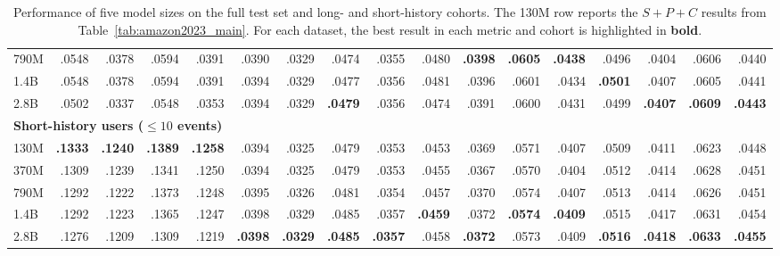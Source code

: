 ﻿\documentclass[sigconf,anonymous,review]{acmart}
\begin{document}
\begin{table}[!tbp]
{\begin{tabular}{l*{4}{rrrr}}
790M & .0548 & .0378 & .0594 & .0391 & .0390 & .0329 & .0474 & .0355 & .0480 & \textbf{.0398} & \textbf{.0605} & \textbf{.0438} & .0496 & .0404 & .0606 & .0440 \\
1.4B & .0548 & .0378 & .0594 & .0391 & .0394 & .0329 & .0477 & .0356 & .0481 & .0396 & .0601 & .0434 & \textbf{.0501} & .0407 & .0605 & .0441 \\
2.8B & .0502 & .0337 & .0548 & .0353 & .0394 & .0329 & \textbf{.0479} & .0356 & .0474 & .0391 & .0600 & .0431 & .0499 & \textbf{.0407} & \textbf{.0609} & \textbf{.0443} \\
        \midrule
        \multicolumn{17}{l}{\textbf{Short-history users ($\leq10$ events)}} \\
130M & \textbf{.1333} & \textbf{.1240} & \textbf{.1389} & \textbf{.1258} & .0394 & .0325 & .0479 & .0353 & .0453 & .0369 & .0571 & .0407 & .0509 & .0411 & .0623 & .0448 \\
370M & .1309 & .1239 & .1341 & .1250 & .0394 & .0325 & .0479 & .0353 & .0455 & .0367 & .0570 & .0404 & .0512 & .0414 & .0628 & .0451 \\
790M & .1292 & .1222 & .1373 & .1248 & .0395 & .0326 & .0481 & .0354 & .0457 & .0370 & .0574 & .0407 & .0513 & .0414 & .0626 & .0451 \\
1.4B & .1292 & .1223 & .1365 & .1247 & .0398 & .0329 & .0485 & .0357 & \textbf{.0459} & .0372 & \textbf{.0574} & \textbf{.0409} & .0515 & .0417 & .0631 & .0454 \\
2.8B & .1276 & .1209 & .1309 & .1219 & \textbf{.0398} & \textbf{.0329} & \textbf{.0485} & \textbf{.0357} & .0458 & \textbf{.0372} & .0573 & .0409 & \textbf{.0516} & \textbf{.0418} & \textbf{.0633} & \textbf{.0455} \\
        \bottomrule
    \end{tabular}%
    }
    \caption{Performance of five model sizes on the full test set and long- and short-history cohorts. The 130M row reports the $S+P+C$ results from Table~\ref{tab:amazon2023_main}. For each dataset, the best result in each metric and cohort is highlighted in \textbf{bold}.}
    \label{tab:rq7_model_size}
\end{table}
\end{document}
